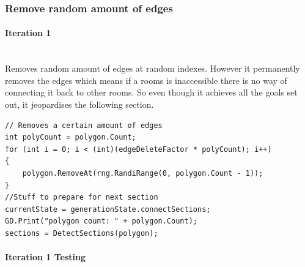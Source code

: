 \documentclass{article}
\newcommand{\myparagraph}[1]{\paragraph{#1}\mbox{}\\} %
\begin{document}
\subsubsection{Remove random amount of edges}
\myparagraph{Iteration 1}
Removes random amount of edges at random indexes. However it permanently removes the edges which means if a rooms is inaccessible there is no way of connecting it back to other rooms. So even though it achieves all the goals set out, it jeopardises the following section.
\begin{lstlisting}
// Removes a certain amount of edges
int polyCount = polygon.Count;
for (int i = 0; i < (int)(edgeDeleteFactor * polyCount); i++)
{
    polygon.RemoveAt(rng.RandiRange(0, polygon.Count - 1));
}
//Stuff to prepare for next section
currentState = generationState.connectSections;
GD.Print("polygon count: " + polygon.Count);
sections = DetectSections(polygon);
\end{lstlisting}

\myparagraph{Iteration 1 Testing}
\end{document}
